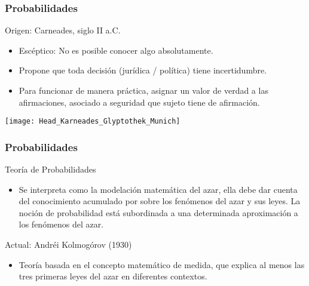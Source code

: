 \documentclass[table]{beamer}
\begin{document}
\begin{frame}
    \frametitle{Probabilidades}
    \begin{block}{Origen: Carneades, siglo II a.C.}
        \begin{itemize}
            \item Escéptico: No es posible conocer algo absolutamente.
            \item Propone que toda decisión (jurídica / política) tiene incertidumbre.
            \item Para funcionar de manera práctica, asignar un valor de verdad a las afirmaciones, asociado a seguridad que sujeto tiene de afirmación.
        \end{itemize}
    \end{block}
    \begin{center}
        \texttt{[image: Head\_Karneades\_Glyptothek\_Munich]}
    \end{center}
\end{frame}

\begin{frame}
    \frametitle{Probabilidades}
    \begin{block}{Teoría de Probabilidades}
        \begin{itemize}
            \item Se interpreta como la modelación matemática del azar, ella debe dar cuenta del conocimiento acumulado por sobre los fenómenos del azar y sus leyes. La noción de probabilidad está subordinada a una determinada aproximación a los fenómenos del azar.
        \end{itemize}
    \end{block}
    \begin{block}{Actual: Andréi Kolmogórov (1930)}
        \begin{itemize}
            \item Teoría basada en el concepto matemático de medida, que explica al menos las tres primeras leyes del azar en diferentes contextos.
        \end{itemize}
    \end{block}

    
    
\end{frame}
\end{document}
